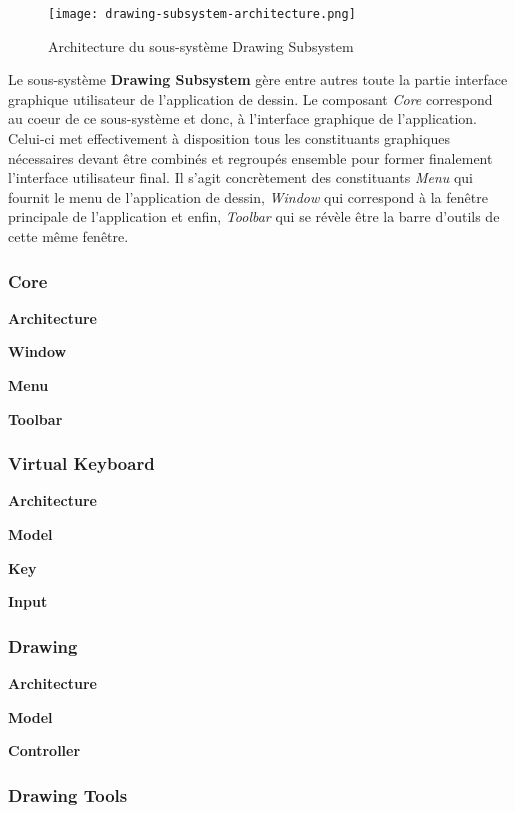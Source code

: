 \documentclass[11pt,a4paper,oldfontcommands]{memoir}
\begin{document}
\begin{figure}[H]
\centering
\texttt{[image: drawing-subsystem-architecture.png]}
\caption{Architecture du sous-système Drawing Subsystem}
\end{figure}

Le sous-système \textbf{Drawing Subsystem} gère entre autres toute la partie interface graphique utilisateur de l'application de dessin. Le composant \textit{Core} correspond au coeur de ce sous-système et donc, à l'interface graphique de l'application. Celui-ci met effectivement à disposition tous les constituants graphiques nécessaires devant être combinés et regroupés ensemble pour former finalement l'interface utilisateur final. Il s'agit concrètement des constituants \textit{Menu} qui fournit le menu de l'application de dessin, \textit{Window} qui correspond à la fenêtre principale de l'application et enfin, \textit{Toolbar} qui se révèle être la barre d'outils de cette même fenêtre.



\subsubsection{Core}

\textbf{Architecture}

\textbf{Window}

\textbf{Menu}

\textbf{Toolbar}

\subsubsection{Virtual Keyboard}

\textbf{Architecture}

\textbf{Model}

\textbf{Key}

\textbf{Input}

\subsubsection{Drawing}

\textbf{Architecture}

\textbf{Model}

\textbf{Controller}

\subsubsection{Drawing Tools}
\end{document}
